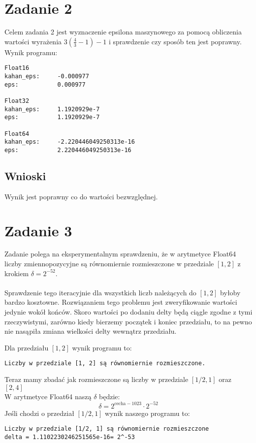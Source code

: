 \documentclass{article}
\begin{document}
\section{Zadanie 2}
Celem zadania 2 jest wyznaczenie epsilona maszynowego za pomocą obliczenia wartości wyrażenia \( 3 \left( \frac{4}{3} - 1 \right) - 1 \) i sprawdzenie czy sposób ten jest poprawny.\\
\noindent Wynik programu:\\
\begin{verbatim}
Float16
kahan_eps:     -0.000977
eps:           0.000977

Float32
kahan_eps:     1.1920929e-7
eps:           1.1920929e-7

Float64
kahan_eps:     -2.220446049250313e-16
eps:           2.220446049250313e-16
\end{verbatim}

\subsection*{Wnioski} Wynik jest poprawny co do wartości bezwzględnej.

\section{Zadanie 3}
Zadanie polega na eksperymentalnym sprawdzeniu, że w arytmetyce Float64 liczby zmiennopozycyjne są równomiernie rozmieszczone w przedziale $[1, 2]$ z krokiem $\delta = 2^{-52}$.\\\\
Sprawdzenie tego iteracyjnie dla wszystkich liczb należących do $[1, 2]$ byłoby bardzo kosztowne. Rozwiązaniem tego problemu jest zweryfikowanie wartości jedynie wokół końców. Skoro wartości po dodaniu delty będą ciągle zgodne z tymi rzeczywistymi, zarówno kiedy bierzemy początek i koniec przedziału, to na pewno nie nasąpiła zmiana wielkości delty wewnątrz przedziału.

\noindent Dla przedziału $[1, 2]$ wynik programu to:\\
\begin{verbatim}
Liczby w przedziale [1, 2] są równomiernie rozmieszczone.
\end{verbatim}

\noindent Teraz mamy zbadać jak rozmieszczone są liczby w przedziale $[1/2, 1]$ oraz $[2, 4]$\\
W arytmetyce Float64 naszą $\delta$ będzie:
\[
\delta = 2^{\text{cecha} - 1023} \cdot 2^{-52}
\]
Jeśli chodzi o przedział $[1/2, 1]$ wynik naszego programu to:
\begin{verbatim}
Liczby w przedziale [1/2, 1] są równomiernie rozmieszczone
delta = 1.1102230246251565e-16= 2^-53
\end{verbatim}
\end{document}
